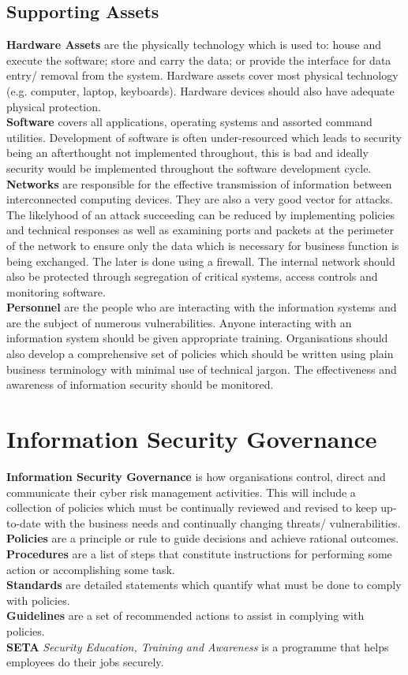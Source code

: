 \documentclass[a4paper,11pt]{article}
\begin{document}
\subsection{Supporting Assets}
\textbf{Hardware Assets} are the physically technology which is used to: house and execute the software; store and carry the data; or provide the interface for data entry/ removal from the system. Hardware assets cover most physical technology (e.g. computer, laptop, keyboards). Hardware devices should also have adequate physical protection.\\
\textbf{Software} covers all applications, operating systems and assorted command utilities. Development of software is often under-resourced which leads to security being an afterthought not implemented throughout, this is bad and ideally security would be implemented throughout the software development cycle.\\
\textbf{Networks} are responsible for the effective transmission of information between interconnected computing devices. They are also a very good vector for attacks. The likelyhood of an attack succeeding can be reduced by implementing policies and technical responses as well as examining ports and packets at the perimeter of the network to ensure only the data which is necessary for business function is being exchanged. The later is done using a firewall. The internal network should also be protected through segregation of critical systems, access controls and monitoring software.\\
\textbf{Personnel} are the people who are interacting with the information systems and are the subject of numerous vulnerabilities. Anyone interacting with an information system should be given appropriate training. Organisations should also develop a comprehensive set of policies which should be written using plain business terminology with minimal use of technical jargon. The effectiveness and awareness of information security should be monitored.

\section{Information Security Governance}
\textbf{Information Security Governance} is how organisations control, direct and communicate their cyber risk management activities. This will include a collection of policies which must be continually reviewed and revised to keep up-to-date with the business needs and continually changing threats/ vulnerabilities.\\
\textbf{Policies} are a principle or rule to guide decisions and achieve rational outcomes.\\
\textbf{Procedures} are a list of steps that constitute instructions for performing some action or accomplishing some task.\\
\textbf{Standards} are detailed statements which quantify what must be done to comply with policies.\\
\textbf{Guidelines} are a set of recommended actions to assist in complying with policies.\\
\textbf{SETA} \textit{Security Education, Training and Awareness} is a programme that helps employees do their jobs securely. 
\end{document}
